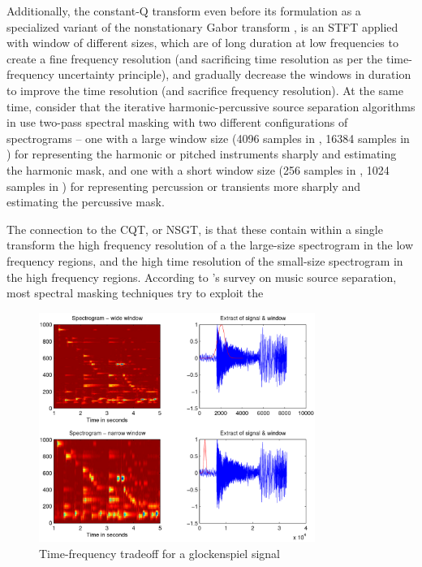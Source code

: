 \documentclass[report.tex]{subfiles}
\begin{document}
Additionally, the constant-Q transform \cite{jbrown, klapuricqt, invertiblecqt} even before its formulation as a specialized variant of the nonstationary Gabor transform \cite{balazs}, is an STFT applied with window of different sizes, which are of long duration at low frequencies to create a fine frequency resolution (and sacrificing time resolution as per the time-frequency uncertainty principle), and gradually decrease the windows in duration to improve the time resolution (and sacrifice frequency resolution). At the same time, consider that the iterative harmonic-percussive source separation algorithms in \cite{driedger, fitzgerald2} use two-pass spectral masking with two different configurations of spectrograms -- one with a large window size (4096 samples in \cite{driedger}, 16384 samples in \cite{fitzgerald2}) for representing the harmonic or pitched instruments sharply and estimating the harmonic mask, and one with a short window size (256 samples in \cite{driedger}, 1024 samples in \cite{fitzgerald2}) for representing percussion or transients more sharply and estimating the percussive mask.

The connection to the CQT, or NSGT, is that these contain within a single transform the high frequency resolution of a the large-size spectrogram in the low frequency regions, and the high time resolution of the small-size spectrogram in the high frequency regions. According to \textcite{musicsepgood}'s survey on music source separation, most spectral masking techniques try to exploit the 

\begin{figure}[ht]
	\centering
	\includegraphics[width=9cm]{./images-tftheory/tf_tradeoff_dorfler.png}
	\caption{Time-frequency tradeoff for a glockenspiel signal}
	\label{fig:dorflertradeoff}
\end{figure}
\end{document}
